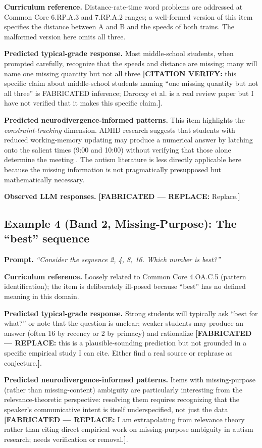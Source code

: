 \documentclass[11pt,letterpaper]{article}
\newcommand{\fabricated}[1]{{\color{red}\textbf{[FABRICATED --- REPLACE:} #1\textbf{]}}}
\newcommand{\citeverify}[1]{{\color{orange}\textbf{[CITATION VERIFY:} #1\textbf{]}}}
\begin{document}
\textbf{Curriculum reference.} Distance-rate-time word problems are addressed at Common Core 6.RP.A.3 and 7.RP.A.2 ranges; a well-formed version of this item specifies the distance between A and B and the speeds of both trains. The malformed version here omits all three.

\textbf{Predicted typical-grade response.} Most middle-school students, when prompted carefully, recognize that the speeds and distance are missing; many will name one missing quantity but not all three \citep{daroczy2015} \citeverify{this specific claim about middle-school students naming ``one missing quantity but not all three'' is FABRICATED inference; Daroczy et al. is a real review paper but I have not verified that it makes this specific claim.}.

\textbf{Predicted neurodivergence-informed patterns.} This item highlights the \emph{constraint-tracking} dimension. ADHD research suggests that students with reduced working-memory updating may produce a numerical answer by latching onto the salient times (9:00 and 10:00) without verifying that those alone determine the meeting \citep{re2016, diamond2013}. The autism literature is less directly applicable here because the missing information is not pragmatically presupposed but mathematically necessary.

\textbf{Observed LLM responses.} \fabricated{Replace.}

\subsection{Example 4 (Band 2, Missing-Purpose): The ``best'' sequence}

\textbf{Prompt.} \textit{``Consider the sequence 2, 4, 8, 16. Which number is best?''}

\textbf{Curriculum reference.} Loosely related to Common Core 4.OA.C.5 (pattern identification); the item is deliberately ill-posed because ``best'' has no defined meaning in this domain.

\textbf{Predicted typical-grade response.} Strong students will typically ask ``best for what?'' or note that the question is unclear; weaker students may produce an answer (often 16 by recency or 2 by primacy) and rationalize \fabricated{this is a plausible-sounding prediction but not grounded in a specific empirical study I can cite. Either find a real source or rephrase as conjecture.}.

\textbf{Predicted neurodivergence-informed patterns.} Items with missing-purpose (rather than missing-content) ambiguity are particularly interesting from the relevance-theoretic perspective: resolving them requires recognizing that the speaker's communicative intent is itself underspecified, not just the data \fabricated{I am extrapolating from relevance theory rather than citing direct empirical work on missing-purpose ambiguity in autism research; needs verification or removal.}.
\end{document}
